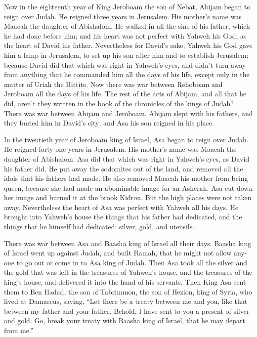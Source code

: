 \begin{paracol}{2}
\begin{otherlanguage}{english}
 Now in the eighteenth year of King Jeroboam the son of
Nebat, Abijam began to reign over Judah.  He reigned three
years in Jerusalem. His mother's name was Maacah the daughter of
Abishalom.  He walked in all the sins of his father, which
he had done before him; and his heart was not perfect with Yahweh his
God, as the heart of David his father.  Nevertheless for
David's sake, Yahweh his God gave him a lamp in Jerusalem, to set up his
son after him and to establish Jerusalem;  because David
did that which was right in Yahweh's eyes, and didn't turn away from
anything that he commanded him all the days of his life, except only in
the matter of Uriah the Hittite.  Now there was war
between Rehoboam and Jeroboam all the days of his life. 
The rest of the acts of Abijam, and all that he did, aren't they written
in the book of the chronicles of the kings of Judah? There was war
between Abijam and Jeroboam.  Abijam slept with his
fathers, and they buried him in David's city; and Asa his son reigned in
his place.

 In the twentieth year of Jeroboam king of Israel, Asa
began to reign over Judah.  He reigned forty-one years in
Jerusalem. His mother's name was Maacah the daughter of Abishalom.
 Asa did that which was right in Yahweh's eyes, as David
his father did.  He put away the sodomites out of the
land, and removed all the idols that his fathers had made.
 He also removed Maacah his mother from being queen,
because she had made an abominable image for an Asherah. Asa cut down
her image and burned it at the brook Kidron.  But the
high places were not taken away. Nevertheless the heart of Asa was
perfect with Yahweh all his days.  He brought into
Yahweh's house the things that his father had dedicated, and the things
that he himself had dedicated: silver, gold, and utensils.

 There was war between Asa and Baasha king of Israel all
their days.  Baasha king of Israel went up against Judah,
and built Ramah, that he might not allow anyone to go out or come in to
Asa king of Judah.  Then Asa took all the silver and the
gold that was left in the treasures of Yahweh's house, and the treasures
of the king's house, and delivered it into the hand of his servants.
Then King Asa sent them to Ben Hadad, the son of Tabrimmon, the son of
Hezion, king of Syria, who lived at Damascus, saying, 
``Let there be a treaty between me and you, like that between my father
and your father. Behold, I have sent to you a present of silver and
gold. Go, break your treaty with Baasha king of Israel, that he may
depart from me.''


\end{otherlanguage}
\end{paracol}
